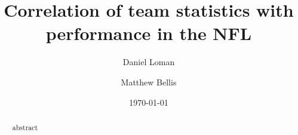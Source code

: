 \documentclass[aps,prl,reprint,groupedaddress]{revtex4-1}
\begin{document}

\title{Correlation of team statistics with performance in the NFL}


\author{Daniel Loman}
\author{Matthew Bellis}


\date{\today}

\begin{abstract}
abstract
\end{abstract}

\pacs{}

\maketitle

\end{document}
